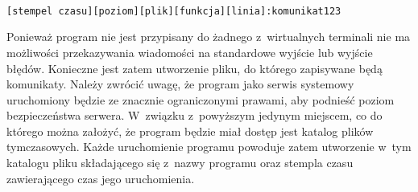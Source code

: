 \vspace{0.5cm}
\begin{minipage}{\textwidth}
\begin{lstlisting}[linewidth=0.99\textwidth, caption=Format komunikatu przekazywanego użytkownikowi]

[stempel czasu][poziom][plik][funkcja][linia]:komunikat123

\end{lstlisting}
\end{minipage}
\vspace{0.5cm}

Ponieważ program nie jest przypisany do żadnego z~wirtualnych
terminali nie ma możliwości przekazywania wiadomości na standardowe
wyjście lub wyjście błędów. Konieczne jest zatem utworzenie pliku, do
którego zapisywane będą komunikaty. Należy zwrócić uwagę, że program
jako serwis systemowy uruchomiony będzie ze znacznie ograniczonymi
prawami, aby podnieść poziom bezpieczeństwa serwera. W~związku
z~powyższym jedynym miejscem, co do którego można założyć, że program
będzie miał dostęp jest katalog plików tymczasowych. Każde
uruchomienie programu powoduje zatem utworzenie w~tym katalogu pliku
składającego się z~nazwy programu oraz stempla czasu zawierającego
czas jego uruchomienia.
